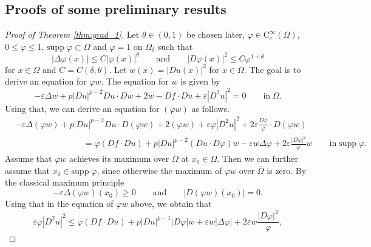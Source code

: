 \documentclass[11pt,reqno]{amsart}
\numberwithin{figure}{section}
\theoremstyle{plain}
\theoremstyle{remark}
\numberwithin{equation}{section}
\begin{document}
\begin{appendices}
\section{Proofs of some preliminary results}
\begin{proof}[Proof of Theorem \ref{thm:grad_1}] Let $\theta\in (0,1)$ be chosen later, $\varphi\in \mathrm{C}_c^\infty(\Omega)$, $0\leq \varphi\leq 1$, $\mathrm{supp}\;\varphi\subset \Omega$ and $\varphi = 1$ on $\Omega_\delta$ such that
\begin{equation}\label{e:ass_power}
    |\Delta \varphi(x)| \leq C|\varphi(x)|^\theta \qquad\text{and}\qquad |D \varphi(x)|^2 \leq C\varphi^{1+\theta}
\end{equation}
for $x\in \Omega$ and $C = C(\delta,\theta)$.
Let $w(x) = |Du(x)|^2$ for $x\in \Omega$. The goal is to derive an equation for $\varphi w$. The equation for $w$ is given by
\begin{equation*}
    -\varepsilon \Delta w + p|D u|^{p-2}D u \cdot D w + 2  w - D f\cdot D u + \varepsilon |D^2u|^2 = 0 \qquad\text{in}\;\Omega.
\end{equation*}
Using that, we can derive an equation for $(\varphi w)$ as follows.
\begin{align*}
    &-\varepsilon \Delta (\varphi w) + p|D u|^{p-2}D u \cdot D (\varphi w) + 2  (\varphi w) + \varepsilon \varphi|D^2u|^2 + 2\varepsilon \frac{D \varphi}{\varphi}\cdot D (\varphi w) \\
    &\qquad\qquad\qquad\qquad = \varphi(D f\cdot D u) + p|D u|^{p-2}(D u\cdot D \varphi)w -\varepsilon w \Delta \varphi + 2\varepsilon \frac{|D \varphi|^2}{\varphi}w
    \qquad\text{in}\;\mathrm{supp}\;\varphi.
\end{align*}
Assume that $\varphi w$ achieves its maximum over $\overline{\Omega}$ at $x_0\in \Omega$. Then we can further assume that $x_0\in \mathrm{supp}\;\varphi$, since otherwise the maximum of $\varphi w$ over $\overline{\Omega}$ is zero. By the classical maximum principle 
\begin{equation*}
    -\varepsilon \Delta(\varphi w)(x_0)\geq 0 \qquad\text{and}\qquad |D(\varphi w)(x_0)| = 0.
\end{equation*}
Using that in the equation of $\varphi w$ above, we obtain that
\begin{equation*}
    \varepsilon \varphi|D^2u|^2 \leq  \varphi (Df\cdot Du)+ p|Du|^{p-1} |D\varphi|w + \varepsilon w |\Delta\varphi|  + 2\varepsilon  w\frac{|D\varphi|^2}{\varphi},
\end{equation*}

\end{proof}
\end{appendices}
\end{document}
